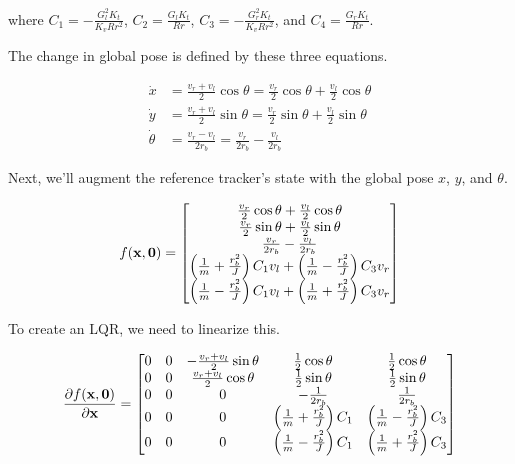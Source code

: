 where $C_1 = -\frac{G_l^2 K_t}{K_v R r^2}$, $C_2 = \frac{G_l K_t}{Rr}$,
$C_3 = -\frac{G_r^2 K_t}{K_v R r^2}$, and $C_4 = \frac{G_r K_t}{Rr}$.

The change in global pose is defined by these three equations.

\begin{align*}
  \dot{x} &= \frac{v_r + v_l}{2}\cos\theta = \frac{v_r}{2}\cos\theta +
    \frac{v_l}{2}\cos\theta \\
  \dot{y} &= \frac{v_r + v_l}{2}\sin\theta = \frac{v_r}{2}\sin\theta +
    \frac{v_l}{2}\sin\theta \\
  \dot{\theta} &= \frac{v_r - v_l}{2r_b} = \frac{v_r}{2r_b} - \frac{v_l}{2r_b}
\end{align*}

Next, we'll augment the reference tracker's state with the global pose $x$, $y$,
and $\theta$.

\begin{equation}
  f(\mathbf{x}, \mathbf{0}) =
  \begin{bmatrix}
    \frac{v_r}{2}\cos\theta + \frac{v_l}{2}\cos\theta \\
    \frac{v_r}{2}\sin\theta + \frac{v_l}{2}\sin\theta \\
    \frac{v_r}{2r_b} - \frac{v_l}{2r_b} \\
    \left(\frac{1}{m} + \frac{r_b^2}{J}\right) C_1 v_l +
      \left(\frac{1}{m} - \frac{r_b^2}{J}\right) C_3 v_r \\
    \left(\frac{1}{m} - \frac{r_b^2}{J}\right) C_1 v_l +
      \left(\frac{1}{m} + \frac{r_b^2}{J}\right) C_3 v_r
  \end{bmatrix}
  \label{eq:linearized_diff_drive_f}
\end{equation}

To create an LQR, we need to linearize this.

\begin{equation*}
  \frac{\partial f(\mathbf{x}, \mathbf{0})}{\partial\mathbf{x}} =
  \begin{bmatrix}
    0 & 0 & -\frac{v_r + v_l}{2}\sin\theta & \frac{1}{2}\cos\theta &
      \frac{1}{2}\cos\theta \\
    0 & 0 & \frac{v_r + v_l}{2}\cos\theta & \frac{1}{2}\sin\theta &
      \frac{1}{2}\sin\theta \\
    0 & 0 & 0 & -\frac{1}{2r_b} & \frac{1}{2r_b} \\
    0 & 0 & 0 & \left(\frac{1}{m} + \frac{r_b^2}{J}\right) C_1 &
      \left(\frac{1}{m} - \frac{r_b^2}{J}\right) C_3 \\
    0 & 0 & 0 & \left(\frac{1}{m} - \frac{r_b^2}{J}\right) C_1 &
      \left(\frac{1}{m} + \frac{r_b^2}{J}\right) C_3
  \end{bmatrix}
\end{equation*}

